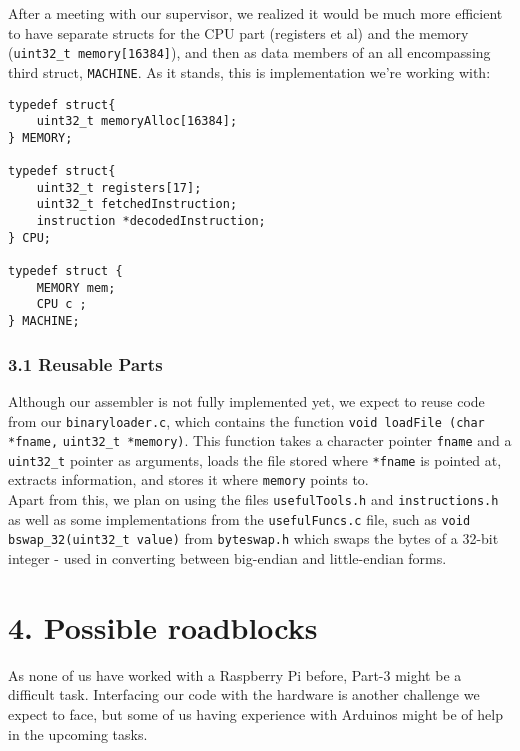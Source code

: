\documentclass[a4paper, twoside]{report}
\begin{document}
After a meeting with our supervisor, we realized it would be much more efficient to have separate structs for the CPU part (registers et al) and the memory (\verb|uint32_t memory[16384]|), and then as data members of an all encompassing third struct, \verb|MACHINE|. As it stands, this is implementation we're working with: 

\begin{lstlisting} 
typedef struct{
    uint32_t memoryAlloc[16384];
} MEMORY;

typedef struct{
    uint32_t registers[17];
    uint32_t fetchedInstruction;
    instruction *decodedInstruction;
} CPU;

typedef struct {
    MEMORY mem;
    CPU c ;
} MACHINE;

\end{lstlisting}


\subsubsection*{3.1 Reusable Parts}

Although our assembler is not fully implemented yet, we expect to reuse code from our \verb|binaryloader.c|, which contains the function \verb|void loadFile (char *fname,| \verb|uint32_t *memory)|. This function takes a character pointer \verb|fname| and a \verb|uint32_t| pointer as arguments, loads the file stored where \verb|*fname| is pointed at, extracts information, and stores it where \verb|memory| points to. \\
Apart from this, we plan on using the files \verb|usefulTools.h| and \verb|instructions.h| as well as some implementations from the \verb|usefulFuncs.c| file, such as \verb|void bswap_32(uint32_t value)| from \verb|byteswap.h| which swaps the bytes of a 32-bit integer - used in converting between big-endian and little-endian forms.


\section*{}

\section*{4. Possible roadblocks}
As none of us have worked with a Raspberry Pi before, Part-3 might be a difficult task. Interfacing our code with the hardware is another challenge we expect to face, but some of us having experience with Arduinos might be of help in the upcoming tasks.\\
\end{document}

